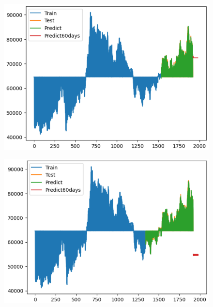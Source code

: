 \documentclass{article}
\begin{document}
\begin{multicols}{2}
\begin{figure}[H]
    \centering
    \begin{minipage}{0.15\textwidth}
    \centering
    \includegraphics[width=1\textwidth]{Image/XGBoost/SAMSUNG_6_4_60.png}
   
    \label{fig:1}
    \end{minipage}%
    \begin{minipage}{0.15\textwidth}
    \centering
    \includegraphics[width=1\textwidth]{Image/XGBoost/SAMSUNG_7_3_60.png}
  

\end{minipage}
\end{figure}
\end{multicols}
\end{document}
